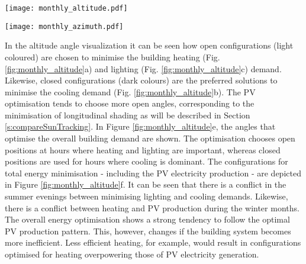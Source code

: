 	\begin{figure*}
		\begin{center}
		\texttt{[image: monthly\_altitude.pdf]}
		\caption{Carpet plots detailing the optimal altitude angles to minimise the (a) heating demand, (b) cooling demand, (c) lighting demand, and (d) maximise PV electricity production. Figure (e) details the combinations for optimum building thermal management without PV production, (f) also includes the PV production. Small angles correspond to closed positions, whereas large angles represent open positions. The corresponding azimuth angles for each hour can be seen in the following Figure (\ref{fig:monthly_azimuth}).}
		\label{fig:monthly_altitude}
		\end{center}
	\end{figure*}

	\begin{figure*}
		\begin{center}
		\texttt{[image: monthly\_azimuth.pdf]}
		\caption{Carpet plots detailing the optimal azimuth angles to minimise the (a) heating demand, (b) cooling demand, (c) lighting demand, and (d) maximise PV electricity production. Figure (e) details the combinations for optimum building thermal management without PV production, (f) also includes the PV production. Negative angles correspond to the panels facing west, whereas positive angles represent east-facing panels. The corresponding altitude angles for each hour can be seen in the previous Figure (\ref{fig:monthly_altitude}).}
		\label{fig:monthly_azimuth}
		\end{center}
	\end{figure*}

	In the altitude angle visualization it can be seen how open configurations (light coloured) are chosen to minimise the building heating (Fig. \ref{fig:monthly_altitude}a) and lighting (Fig. \ref{fig:monthly_altitude}c) demand. Likewise, closed configurations (dark colours) are the preferred solutions to minimise the cooling demand (Fig. \ref{fig:monthly_altitude}b). The PV optimisation tends to choose more open angles, corresponding to the minimisation of longitudinal shading as will be described in Section \ref{s:compareSunTracking}. In Figure \ref{fig:monthly_altitude}e, the angles that optimise the overall building demand are shown. The optimisation chooses open positions at hours where heating and lighting are important, whereas closed positions are used for hours where cooling is dominant. The configurations for total energy minimisation - including the PV electricity production - are depicted in Figure \ref{fig:monthly_altitude}f. It can be seen that there is a conflict in the summer evenings between minimising lighting and cooling demands. Likewise, there is a conflict between heating and PV production during the winter months. The overall energy optimisation shows a strong tendency to follow the optimal PV production pattern. This, however, changes if the building system becomes more inefficient. Less efficient heating, for example, would result in configurations optimised for heating overpowering those of PV electricity generation.

